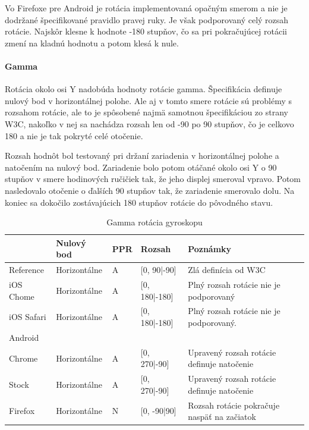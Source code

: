 Vo Firefoxe pre Android je rotácia implementovaná opačným smerom a nie je dodržané špecifikované pravidlo pravej ruky. Je však podporovaný celý rozsah rotácie. Najskôr klesne k hodnote -180 stupňov, čo sa pri pokračujúcej rotácii zmení na kladnú hodnotu a potom klesá k nule.



\paragraph{Gamma} %
\label{par:gamma}

Rotácia okolo osi Y nadobúda hodnoty rotácie gamma. Špecifikácia definuje nulový bod v horizontálnej polohe. Ale aj v tomto smere rotácie sú problémy s rozsahom rotácie, ale to je spôsobené najmä samotnou špecifikáciou zo strany W3C, nakoľko v nej sa nachádza rozsah len od -90 po 90 stupňov, čo je celkovo 180 a nie je tak pokryté celé otočenie.

Rozsah hodnôt bol testovaný pri držaní zariadenia v horizontálnej polohe a natočením na nulový bod. Zariadenie bolo potom otáčané okolo osi Y o 90 stupňov v smere hodinových ručičiek tak, že jeho displej smeroval vpravo. Potom nasledovalo otočenie o ďalších 90 stupňov tak, že zariadenie smerovalo dolu. Na koniec sa dokočilo zostávajúcich 180 stupňov rotácie do pôvodného stavu.

\begin{table}[H]
  \begin{tabular}{ | l | l | l | l | l |}
  \hline
              & Nulový bod    & PPR   & Rozsah         & Poznámky\\ \hline
  Reference   & Horizontálne   & A     & [0, 90|-90]   & Zlá definícia od W3C \\  
  iOS Chome   & Horizontálne   & A     & [0, 180|-180] & Plný rozsah rotácie nie je podporovaný \\  
  iOS Safari  & Horizontálne   & A     & [0, 180|-180] & Plný rozsah rotácie nie je podporovaný. \\  
  Android & & & & \\  
  Chrome      & Horizontálne   & A     & [0, 270|-90]  & Upravený rozsah rotácie definuje natočenie \\  
  Stock       & Horizontálne   & A     & [0, 270|-90]  & Upravený rozsah rotácie definuje natočenie \\  
  Firefox     & Horizontálne   & N     & [0, -90|90]   & Rozsah rotácie pokračuje naspäť na začiatok \\
  \hline
  \end{tabular}
  \caption[Gamma rotácia gyroskopu]{Gamma rotácia gyroskopu}
\end{table}

